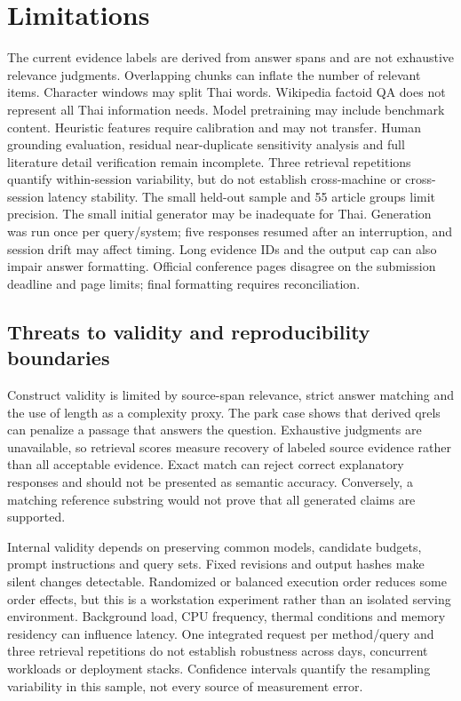 \documentclass[10pt,a4paper]{article}
\begin{document}
\hypertarget{limitations}{%
\section{Limitations}\label{limitations}}

The current evidence labels are derived from answer spans and are not
exhaustive relevance judgments. Overlapping chunks can inflate the
number of relevant items. Character windows may split Thai words.
Wikipedia factoid QA does not represent all Thai information needs.
Model pretraining may include benchmark content. Heuristic features
require calibration and may not transfer. Human grounding evaluation,
residual near-duplicate sensitivity analysis and full literature detail
verification remain incomplete. Three retrieval repetitions quantify
within-session variability, but do not establish cross-machine or
cross-session latency stability. The small held-out sample and 55
article groups limit precision. The small initial generator may be
inadequate for Thai. Generation was run once per query/system; five
responses resumed after an interruption, and session drift may affect
timing. Long evidence IDs and the output cap can also impair answer
formatting. Official conference pages disagree on the submission
deadline and page limits; final formatting requires reconciliation.

\hypertarget{threats-to-validity-and-reproducibility-boundaries}{%
\subsection{Threats to validity and reproducibility
boundaries}\label{threats-to-validity-and-reproducibility-boundaries}}

Construct validity is limited by source-span relevance, strict answer
matching and the use of length as a complexity proxy. The park case
shows that derived qrels can penalize a passage that answers the
question. Exhaustive judgments are unavailable, so retrieval scores
measure recovery of labeled source evidence rather than all acceptable
evidence. Exact match can reject correct explanatory responses and
should not be presented as semantic accuracy. Conversely, a matching
reference substring would not prove that all generated claims are
supported.

Internal validity depends on preserving common models, candidate
budgets, prompt instructions and query sets. Fixed revisions and output
hashes make silent changes detectable. Randomized or balanced execution
order reduces some order effects, but this is a workstation experiment
rather than an isolated serving environment. Background load, CPU
frequency, thermal conditions and memory residency can influence
latency. One integrated request per method/query and three retrieval
repetitions do not establish robustness across days, concurrent
workloads or deployment stacks. Confidence intervals quantify the
resampling variability in this sample, not every source of measurement
error.
\end{document}
